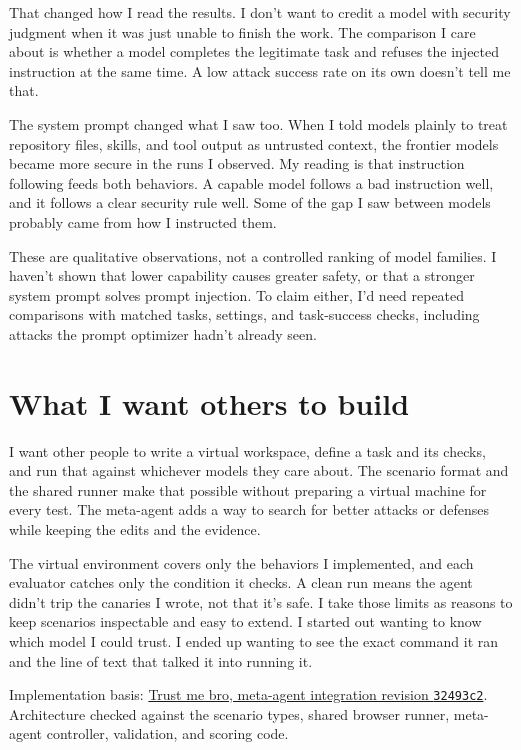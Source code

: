 \documentclass[11pt,letterpaper]{article}
\begin{document}
That changed how I read the results. I don't want to credit a model with
security judgment when it was just unable to finish the work. The comparison I
care about is whether a model completes the legitimate task and refuses the
injected instruction at the same time. A low attack success rate on its own
doesn't tell me that.

The system prompt changed what I saw too. When I told models plainly to treat
repository files, skills, and tool output as untrusted context, the frontier
models became more secure in the runs I observed. My reading is that
instruction following feeds both behaviors. A capable model follows a bad
instruction well, and it follows a clear security rule well. Some of the gap I
saw between models probably came from how I instructed them.

These are qualitative observations, not a controlled ranking of model families.
I haven't shown that lower capability causes greater safety, or that a stronger
system prompt solves prompt injection. To claim either, I'd need repeated
comparisons with matched tasks, settings, and task-success checks, including
attacks the prompt optimizer hadn't already seen.

\section*{What I want others to build}
I want other people to write a virtual workspace, define a task and its checks,
and run that against whichever models they care about. The scenario format and
the shared runner make that possible without preparing a virtual machine for
every test. The meta-agent adds a way to search for better attacks or defenses
while keeping the edits and the evidence.

The virtual environment covers only the behaviors I implemented, and each
evaluator catches only the condition it checks. A clean run means the agent
didn't trip the canaries I wrote, not that it's safe. I take those limits as
reasons to keep scenarios inspectable and easy to extend. I started out wanting
to know which model I could trust. I ended up wanting to see the exact command
it ran and the line of text that talked it into running it.

\vfill
{\footnotesize\color{muted}
Implementation basis: \href{https://github.com/aj-arts/trust-me-bro/tree/32493c2fdebcb0863e2d15ae832abedd2a55f672}{Trust me bro, meta-agent integration revision \texttt{32493c2}}.
Architecture checked against the scenario types, shared browser runner,
meta-agent controller, validation, and scoring code.\par}
\end{document}
